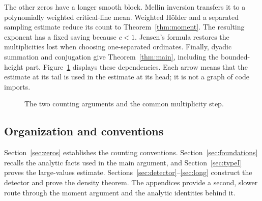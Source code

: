 \documentclass[11pt,a4paper]{article}
\numberwithin{equation}{section}
\theoremstyle{definition}
\begin{document}
The other zeros have a longer smooth block. Mellin inversion transfers it
to a polynomially weighted critical-line mean. Weighted H\"older and a
separated sampling estimate reduce its count to Theorem~\ref{thm:moment}.
The resulting exponent has a fixed saving because $c<1$.
Jensen's formula restores the multiplicities lost when choosing
one-separated ordinates. Finally, dyadic summation and conjugation give
Theorem~\ref{thm:main}, including the bounded-height part.
Figure~\ref{fig:dependencies} displays these dependencies. Each arrow means
that the estimate at its tail is used in the estimate at its head; it is not
a graph of code imports.

\begin{figure}[htbp]
\centering
{}
\caption{The two counting arguments and the common multiplicity step.}
\label{fig:dependencies}
\end{figure}

\subsection{Organization and conventions}
Section~\ref{sec:zeros} establishes the counting conventions.
Section~\ref{sec:foundations} recalls the analytic facts used in the main
argument, and Section~\ref{sec:typeI} proves the large-values estimate.
Sections~\ref{sec:detector}--\ref{sec:long} construct the detector and prove
the density theorem. The appendices provide a second, slower route through
the moment argument and the analytic identities behind it.
\end{document}
